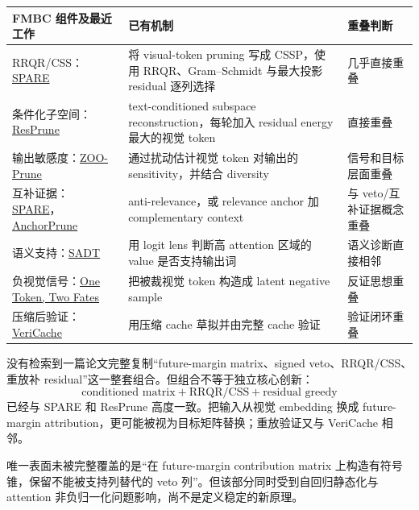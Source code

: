 \documentclass[UTF8,zihao=-4,a4paper]{ctexart}
\begin{document}
\begin{table}[htbp]
\centering
\footnotesize
\begin{tabularx}{\textwidth}{p{}X p{}}
\toprule
FMBC 组件及最近工作 & 已有机制 & 重叠判断 \\
\midrule
RRQR/CSS：\href{https://arxiv.org/abs/2606.18681}{SPARE}
& 将 visual-token pruning 写成 CSSP，使用 RRQR、Gram--Schmidt 与最大投影 residual 逐列选择
& 几乎直接重叠 \\
\addlinespace
条件化子空间：\href{https://arxiv.org/abs/2603.21105}{ResPrune}
& text-conditioned subspace reconstruction，每轮加入 residual energy 最大的视觉 token
& 直接重叠 \\
\addlinespace
输出敏感度：\href{https://aim-skku.github.io/ZOO-Prune/}{ZOO-Prune}
& 通过扰动估计视觉 token 对输出的 sensitivity，并结合 diversity
& 信号和目标层面重叠 \\
\addlinespace
互补证据：\href{https://arxiv.org/abs/2606.18681}{SPARE}，\href{https://arxiv.org/abs/2607.07033}{AnchorPrune}
& anti-relevance，或 relevance anchor 加 complementary context
& 与 veto/互补证据概念重叠 \\
\addlinespace
语义支持：\href{https://openaccess.thecvf.com/content/CVPR2026/papers/Wang_Same_Attention_Different_Truths_Put_Logit-Lens_over_Visual_Attention_to_CVPR_2026_paper.pdf}{SADT}
& 用 logit lens 判断高 attention 区域的 value 是否支持输出词
& 语义诊断直接相邻 \\
\addlinespace
负视觉信号：\href{https://arxiv.org/abs/2603.10360}{One Token, Two Fates}
& 把被裁视觉 token 构造成 latent negative sample
& 反证思想重叠 \\
\addlinespace
压缩后验证：\href{https://arxiv.org/abs/2605.17613}{VeriCache}
& 用压缩 cache 草拟并由完整 cache 验证
& 验证闭环重叠 \\
\bottomrule
\end{tabularx}
\end{table}

没有检索到一篇论文完整复制“future-margin matrix、signed veto、RRQR/CSS、重放补 residual”这一整套组合。但组合不等于独立核心创新：
\[
\text{conditioned matrix}
+\text{RRQR/CSS}
+\text{residual greedy}
\]
已经与 SPARE 和 ResPrune 高度一致。把输入从视觉 embedding 换成 future-margin attribution，更可能被视为目标矩阵替换；重放验证又与 VeriCache 相邻。

唯一表面未被完整覆盖的是“在 future-margin contribution matrix 上构造有符号锥，保留不能被支持列替代的 veto 列”。但该部分同时受到自回归静态化与 attention 非负归一化问题影响，尚不是定义稳定的新原理。
\end{document}
